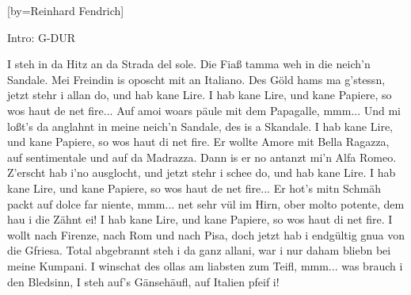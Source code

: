 
[by={Reinhard Fendrich}]

\chordson

\beginverse
\nolyrics Intro: G-DUR
\endverse

\beginverse
I steh in da Hitz an da Strada del sole.
Die Fiaß tamma weh in die neich'n Sandale.
Mei Freindin is oposcht mit an Italiano.
Des Göld hams ma g'stessn, jetzt stehr i allan do,
und hab kane Lire. I hab kane Lire,
und kane Papiere, so wos haut de net fire...
\endverse
\beginverse
Auf amoi woars päule mit dem Papagalle, mmm...
Und mi loßt's da anglahnt
in meine neich'n Sandale, des is a Skandale.
I hab kane Lire, und kane Papiere, so wos haut di net fire.
\endverse
\beginverse
Er wollte Amore mit Bella Ragazza,
auf sentimentale und auf da Madrazza.
Dann is er no antanzt mi'n Alfa Romeo.
Z'erscht hab i'no ausglocht, und jetzt stehr i schee do,
und hab kane Lire. I hab kane Lire,
und kane Papiere, so wos haut de net fire...
\endverse
\beginverse
Er hot's mitn Schmäh packt auf dolce far niente, mmm...
net sehr vül im Hirn, ober molto potente, dem hau i die Zähnt ei!
I hab kane Lire, und kane Papiere, so wos haut di net fire.
\endverse
\beginverse
I wollt nach Firenze, nach Rom und nach Pisa,
doch jetzt hab i endgültig gnua von die Gfriesa.
Total abgebrannt steh i da ganz allani,
war i nur daham bliebn bei meine Kumpani.
\endverse
\beginverse
I winschat des ollas am liabsten zum Teifl, mmm...
was brauch i den Bledsinn,
I steh auf's Gänsehäufl, auf Italien pfeif i!
\endverse

\endsong